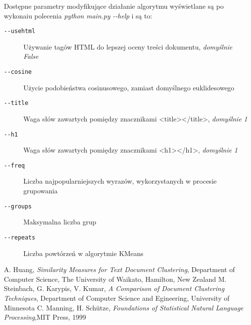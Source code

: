 \documentclass{article}
\begin{document}
Dostępne parametry modyfikujące działanie algorytmu wyświetlane są po wykonaiu polecenia \emph{python main.py -{}-help} i są to:
\begin{description}
\item [\texttt{-{}-usehtml}] Używanie tagów HTML do lepszej oceny treści dokumentu, \emph{domyślnie False}
\item [\texttt{-{}-cosine}] Użycie podobieństwa cosinusowego, zamiast domyślnego euklidesowego
\item [\texttt{-{}-title}] Waga słów zawartych pomiędzy znacznikami <title></title>, \emph{domyślnie 1}
\item [\texttt{-{}-h1}] Waga słów zawartych pomiędzy znacznikami <h1></h1>, \emph{domyślnie 1}
\item [\texttt{-{}-freq}] Liczba najpopularniejszych wyrazów, wykorzystanych w procesie grupowania
\item [\texttt{-{}-groups}] Maksymalna liczba grup
\item [\texttt{-{}-repeats}] Liczba powtórzeń w algorytmie KMeans
\end{description}

\begin{thebibliography}{9}
A. Huang, \emph{Similarity Measures for Text Document Clustering}, Department of Computer Science, The University of Waikato, Hamilton, New Zealand
M. Steinbach, G. Karypis, V. Kumar, \emph{A Comparison of Document Clustering Techniques}, Department of Computer Science and Egineering, University of Minnesota
C. Manning, H. Schütze, \emph{Foundations of Statistical Natural Language Processing},MIT Press, 1999
\end{thebibliography}
\end{document}
